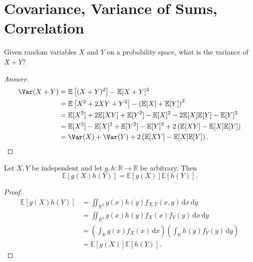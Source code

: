 \section{Covariance, Variance of Sums, Correlation}
\begin{question}
    Given random variables \(X\) and \(Y\) on a probability space, what is the variance of \(X + Y\)?   
\end{question}
\begin{proof}[Answer]
    \begin{align*}
        \Var(X + Y) &= \mathbb{E} \left[ (X + Y)^2 \right] - \mathbb{E} [X + Y]^2 \\
        &= \mathbb{E} \left[ X^2 + 2 X Y + Y^2 \right] - \left( \mathbb{E} [X] + \mathbb{E}[Y] \right)^2 \\
        &= \mathbb{E} [X^2] + 2 \mathbb{E} [X Y] + \mathbb{E} [Y^2] - \mathbb{E} [X]^2 - 2 \mathbb{E} [X] \mathbb{E} [Y] - \mathbb{E} [Y]^2 \\
        &= \mathbb{E} [X^2] - \mathbb{E} [X]^2 + \mathbb{E} [Y^2] - \mathbb{E} [Y]^2 + 2 \left( \mathbb{E} [X Y] - \mathbb{E} [X] \mathbb{E} [Y] \right) \\
        &= \Var(X) + \Var(Y) + 2 \left( \mathbb{E} [XY] - \mathbb{E} [X] \mathbb{E} [Y] \right).    
    \end{align*}
\end{proof}

\begin{proposition}
    Let \(X, Y\) be independent and let \(g, h : \mathbb{R} \to \mathbb{R} \) be arbitrary. Then 
    \[
        \mathbb{E} [g(X) h(Y)] = \mathbb{E} [g(X)] \mathbb{E} [h(Y)].
    \]  
\end{proposition}

\begin{proof}
    \begin{align*}
        \mathbb{E} [g(X) h(Y)] &= \iint_{\mathbb{R} ^2} g(x) h(y) f_{X, Y} (x, y) \, \mathrm{d} x \, \mathrm{d} y \\
        &= \iint_{\mathbb{R} ^2} g(x) h(y) f_X(x) f_Y(y) \, \mathrm{d} x \, \mathrm{d} y \\
        &= \left( \int _{\mathbb{R} } g(x) f_X(x) \, \mathrm{d} x  \right) \left( \int _{\mathbb{R} } h(y) f_Y(y) \, \mathrm{d} y  \right) \\
        &= \mathbb{E} [g(X)] \mathbb{E} [h(Y)].
    \end{align*}
\end{proof}

